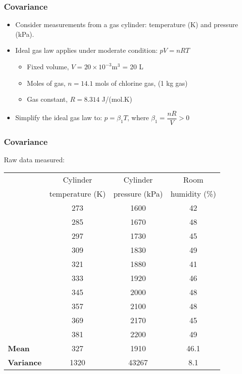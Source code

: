 \begin{frame}\frametitle{Covariance}
	\begin{itemize}
		\item	Consider measurements from a gas cylinder: temperature (K) and pressure (kPa). 
		\item	Ideal gas law applies under moderate condition: $pV = nRT$ 
		\begin{itemize}
			\item	Fixed volume, $V = 20 \times 10^{-3} \text{m}^3$ = 20 L 
			\item	Moles of gas, $n = 14.1$ mols of chlorine gas, (1 kg gas) 
			\item	Gas constant, $R = 8.314$ J/(mol.K) 
		\end{itemize}
	\end{itemize}
	\begin{itemize}
		\item	Simplify the ideal gas law to: $p=\beta_1 T$, where $\beta_1 = \dfrac{nR}{V} > 0$ 
	\end{itemize}
\end{frame}

\begin{frame}\frametitle{Covariance}
	
	Raw data measured:
	\begin{table}
		[ht] \centering 
		\begin{tabular}
			{l c c c} \hline\hline &Cylinder & Cylinder & Room \\
			[0.5ex] &temperature (K) & pressure (kPa) & humidity (\%) \\
			[0.5ex] \hline & 273& 1600& 42\\
			& 285& 1670& 48\\
			& 297& 1730& 45\\
			& 309& 1830& 49\\
			& 321& 1880& 41\\
			& 333& 1920& 46\\
			& 345& 2000& 48\\
			& 357& 2100& 48\\
			& 369& 2170& 45\\
			& 381& 2200& 49\\
			\hline \textbf{Mean}& 327& 1910& 46.1\\
			\textbf{Variance} & 1320 & 43267 & 8.1\\
			\hline 
		\end{tabular}
	\end{table}
\end{frame}


